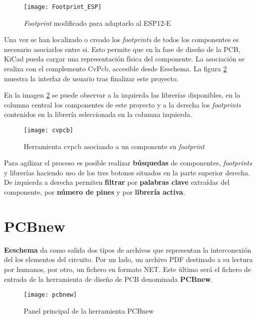 \begin{figure} [h]
    \centering
    \texttt{[image: Footprint\_ESP]}
    \caption{\textit{Footprint }modificado para adaptarlo al ESP12-E}
    \label{fig:Footprint_ESP}
\end{figure}

Una vez se han localizado o creado los \textit{footprints} de todos los componentes es necesario asociarlos entre si. Esto permite que en la fase de diseño de la \acrshort{PCB}, KiCad pueda cargar una representación física del componente. 
La asociación se realiza con el complemento CvPcb, accesible desde Eeschema. La figura \ref{fig:cvpcb} muestra la interfaz de usuario tras finalizar este proyecto.

\clearpage

En la imagen \ref{fig:cvpcb} se puede observar a la izquierda las librerías disponibles, en la columna central los componentes de este proyecto y a la derecha los \textit{footprints} contenidos en la librería seleccionada en la columna izquierda.

\begin{figure} [h]
    \centering
    \texttt{[image: cvpcb]}
    \caption{Herramienta cvpcb asociando a un componente su \textit{footprint}}
    \label{fig:cvpcb}
\end{figure}

Para agilizar el proceso es posible realizar \textbf{búsquedas} de componentes, \textit{footprints} y librerías haciendo uso de los tres botones situados en la parte superior derecha. De izquierda a derecha permiten \textbf{filtrar} por \textbf{palabras clave} extraídas del componente, por \textbf{número de pines} y por \textbf{librería activa}.

\clearpage

\section{PCBnew\label{sec:PCBnew}}

\textbf{Eeschema} da como salida dos tipos de archivos que representan la interconexión del los elementos del circuito. Por un lado, un archivo PDF destinado a su lectura por humanos, por otro, un fichero en formato NET. Este último será el fichero de entrada de la herramienta de diseño de \acrshort{PCB} denominada \textbf{PCBnew}. 

\begin{figure} [h]
    \centering
    \texttt{[image: pcbnew]}
    \caption{Panel principal de la herramienta PCBnew}
    \label{fig:pcbnew_1}
\end{figure}

